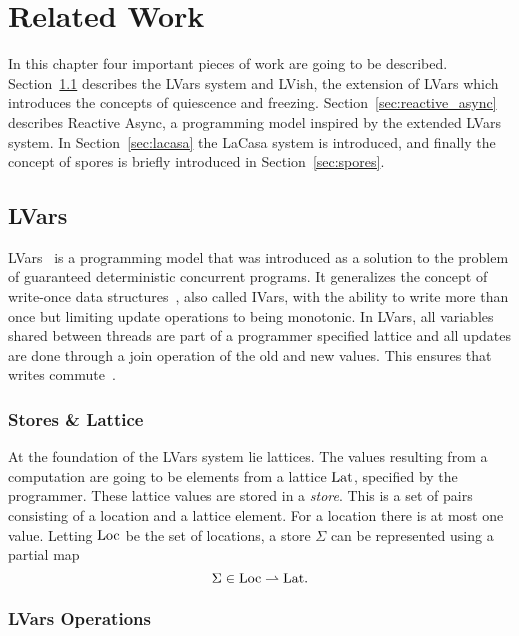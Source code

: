 \chapter{Related Work}\label{cha:related_work}

In this chapter four important pieces of work are going to be described.
Section~\ref{sec:lvars} describes the LVars system and LVish, the extension
of LVars which introduces the concepts of quiescence and freezing. 
Section~\ref{sec:reactive_async} describes Reactive Async, a programming model
inspired by the extended LVars system. In Section~\ref{sec:lacasa} the LaCasa
system is introduced, and finally the concept of spores is briefly introduced in
Section~\ref{sec:spores}.

\section{LVars}\label{sec:lvars}

LVars~\parencite{kuper2013lvars} is a programming model that was introduced as a
solution to the problem of guaranteed deterministic concurrent programs. It
generalizes the concept of write-once data
structures~\parencite{nikhil1989structures}, also called IVars, with the ability
to write more than once but limiting update operations to being monotonic.
In LVars, all variables shared between threads are part of a programmer
specified lattice and all updates are done through a join operation of the old
and new values. This ensures that writes commute~\parencite{kuper2013lvars}.

\subsection{Stores \& Lattice}%
\label{sub:stores_and_lattice}

At the foundation of the LVars system lie lattices. The values resulting from a
computation are going to be elements from a lattice $\mathrm{Lat}$, specified by the
programmer. These lattice values are stored in a \emph{store}.  This is a set of
pairs consisting of a location and a lattice element. For a location there is
at most one value. Letting $\mathrm{Loc}$ be the set of locations, a store $\Sigma$ can
be represented using a partial map
\begin{equation*}
  \Sigma \in \mathrm{Loc} \rightharpoonup \mathrm{Lat}.
\end{equation*}

\subsection{LVars Operations}%
\label{sub:lvars_operations}

